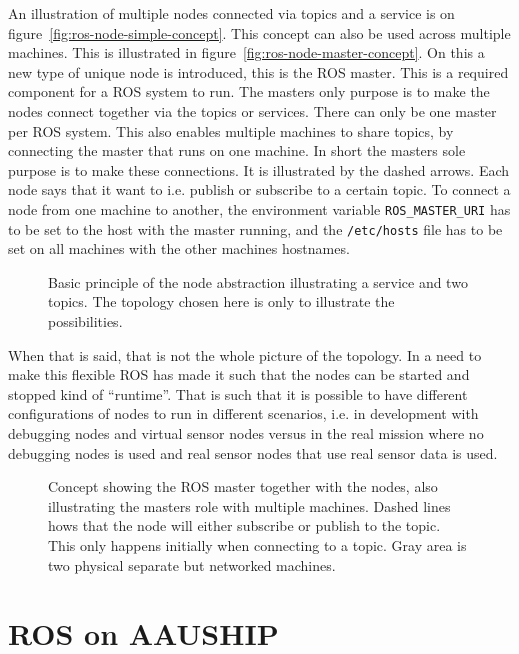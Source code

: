 An illustration of multiple nodes connected via topics and a service
is on figure~\vref{fig:ros-node-simple-concept}. This concept can also
be used across multiple machines. This is illustrated in
figure~\vref{fig:ros-node-master-concept}. On this a new type of unique
node is introduced, this is the \ac{ROS} master. This is a required
component for a ROS system to run. The masters only purpose is to make
the nodes connect together via the topics or services. There can only
be one master per \ac{ROS} system. This also enables multiple machines
to share topics, by connecting the master that runs on one machine. In
short the masters sole purpose is to make these connections. It is
illustrated by the dashed arrows. Each node says that it want to i.e.
publish or subscribe to a certain topic. To connect a node from one
machine to another, the environment variable \texttt{ROS\_MASTER\_URI}
has to be set to the host with the master running, and the
\texttt{/etc/hosts} file has to be set on all machines with the other
machines hostnames.

\begin{figure}[htbp]
	\centering
	
	\caption{Basic principle of the node abstraction illustrating a
	service and two topics. The topology chosen here is only to illustrate
	the possibilities.}
	\label{fig:ros-node-simple-concept}
\end{figure}

When that is said, that is not the whole picture of the topology. In a
need to make this flexible \ac{ROS} has made it such that the nodes
can be started and stopped kind of ``runtime''. That is such that it is
possible to have different configurations of nodes to run in different
scenarios, i.e. in development with debugging nodes and virtual sensor
nodes versus in the real mission where no debugging nodes is used and
real sensor nodes that use real sensor data is used.

\begin{figure}[htbp]
	\centering
	
	\caption{Concept showing the ROS master together with the nodes,
	also illustrating the masters role with multiple machines. Dashed
	lines hows that the node will either subscribe or publish to the
	topic. This only happens initially when connecting to a topic. Gray
	area is two physical separate but networked machines.}
	\label{fig:ros-node-master-concept}
\end{figure}

\section{ROS on AAUSHIP}

